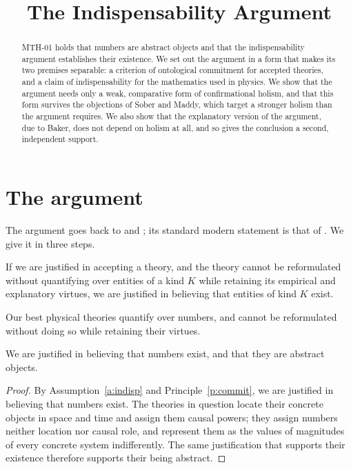 \documentclass{situationist-preprint}
\title{The Indispensability Argument}
\begin{document}
\maketitle

\begin{abstract}
MTH-01 holds that numbers are abstract objects and that the indispensability argument establishes their existence. We set out the argument in a form that makes its two premises separable: a criterion of ontological commitment for accepted theories, and a claim of indispensability for the mathematics used in physics. We show that the argument needs only a weak, comparative form of confirmational holism, and that this form survives the objections of Sober and Maddy, which target a stronger holism than the argument requires. We also show that the explanatory version of the argument, due to Baker, does not depend on holism at all, and so gives the conclusion a second, independent support.
\end{abstract}

\section{The argument}\label{s:arg}

The argument goes back to \citet{Quine1948} and \citet{Putnam1971}; its standard modern statement is that of \citet{Colyvan2001}. We give it in three steps.

\begin{principle}[Commitment]\label{p:commit}
If we are justified in accepting a theory, and the theory cannot be reformulated without quantifying over entities of a kind $K$ while retaining its empirical and explanatory virtues, we are justified in believing that entities of kind $K$ exist.
\end{principle}

\begin{assumption}[Indispensability]\label{a:indisp}
Our best physical theories quantify over numbers, and cannot be reformulated without doing so while retaining their virtues.
\end{assumption}

\begin{proposition}\label{p:exist}
We are justified in believing that numbers exist, and that they are abstract objects.
\end{proposition}

\begin{proof}
By Assumption~\ref{a:indisp} and Principle~\ref{p:commit}, we are justified in believing that numbers exist. The theories in question locate their concrete objects in space and time and assign them causal powers; they assign numbers neither location nor causal role, and represent them as the values of magnitudes of every concrete system indifferently. The same justification that supports their existence therefore supports their being abstract.
\end{proof}
\end{document}
